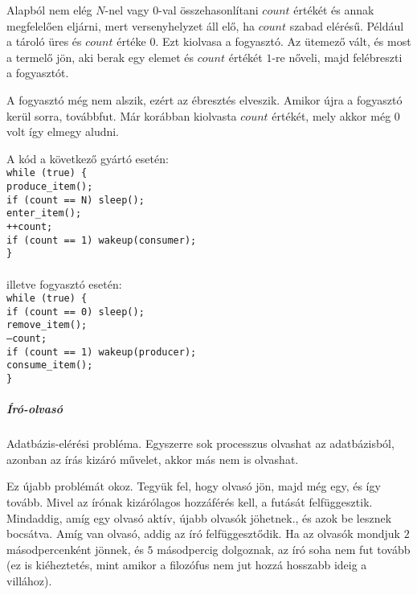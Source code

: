 \documentclass[fleqn,10pt,a4paper]{article}
\newcommand{\ut}[1]{\texttt{#1}}
\theoremstyle{magyar}
\begin{document}
  Alapból nem elég $N$-nel vagy $0$-val összehasonlítani $count$
  értékét és annak megfelelően eljárni, mert versenyhelyzet áll elő,
  ha $count$ szabad elérésű. Például a tároló üres és $count$ értéke
  $0$. Ezt kiolvasa a fogyasztó. Az ütemező vált, és most a termelő
  jön, aki berak egy elemet és $count$ értékét $1$-re nőveli, majd
  felébreszti a fogyasztót. 

  A fogyasztó még nem alszik, ezért az ébresztés elveszik. Amikor újra
  a fogyasztó kerül sorra, továbbfut. Már korábban kiolvasta $count$
  értékét, mely akkor még $0$ volt így elmegy aludni.

  A kód a következő gyártó esetén:\\
  \ut{while (true) \{\\
    \hspace*{.5em}produce\_item();\\
    \hspace*{.5em}if (count == N) sleep();\\
    \hspace*{.5em}enter\_item();\\
    \hspace*{.5em}++count;\\
    \hspace*{.5em}if (count ==  1) wakeup(consumer);\\
    \}\\
  }\\
  illetve fogyasztó esetén:\\
  \ut{while (true) \{\\
    \hspace*{.5em}if (count == 0) sleep();\\
    \hspace*{.5em}remove\_item();\\
    \hspace*{.5em}--count;\\
    \hspace*{.5em} if (count ==  1) wakeup(producer);\\
    \hspace*{.5em}consume\_item();\\
    \}
  }
  
  \subparagraph{Író-olvasó}
  Adatbázis-elérési probléma. Egyszerre sok processzus olvashat az
  adatbázisból, azonban az írás kizáró művelet, akkor más nem is
  olvashat.
  
  Ez újabb problémát okoz. Tegyük fel, hogy olvasó jön, majd még egy,
  és így tovább. Mivel az írónak kizárólagos hozzáférés kell, a
  futását felfüggesztik. Mindaddig, amíg egy olvasó aktív, újabb
  olvasók jöhetnek., és azok be lesznek bocsátva. Amíg van olvasó,
  addig az író felfüggesztődik. Ha az olvasók mondjuk $2$
  másodpercenként jönnek, és $5$ másodpercig dolgoznak, az író soha
  nem fut tovább (ez is kiéheztetés, mint amikor a filozófus nem jut
  hozzá hosszabb ideig a villához).
\end{document}
